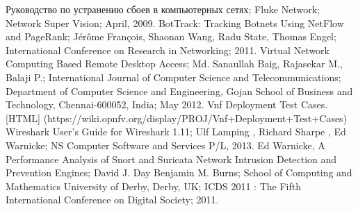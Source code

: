 \documentclass[oneside,final,14pt,a4paper]{extreport}
\begin{document}
\begin{thebibliography}{00}
 Руководство по устранению сбоев в компьютерных сетях; Fluke Network; Network Super Vision; April, 2009.
 BotTrack: Tracking Botnets Using NetFlow and PageRank; Jérôme François, Shaonan Wang, Radu State, Thomas Engel; International Conference on Research in Networking; 2011.
 Virtual Network Computing Based Remote Desktop Access; Md. Sanaullah Baig, Rajasekar M., Balaji P.; International Journal of Computer Science and Telecommunications; Department of Computer Science and Engineering, Gojan School of Business and Technology, Chennai-600052, India; May 2012.
 Vnf Deployment Test Cases. [HTML] (https://wiki.opnfv.org/display/PROJ/Vnf+Deployment+Test+Cases)
 Wireshark User's Guide for Wireshark 1.11; Ulf Lamping , Richard Sharpe , Ed Warnicke; NS Computer Software and Services P/L, 2013.
Ed Warnicke,
 A Performance Analysis of Snort and Suricata Network Intrusion Detection and Prevention Engines; David J. Day Benjamin M. Burns; School of Computing and Mathematics University of Derby, Derby, UK; ICDS 2011 : The Fifth International Conference on Digital Society; 2011.
\end{thebibliography}

\end{document}
